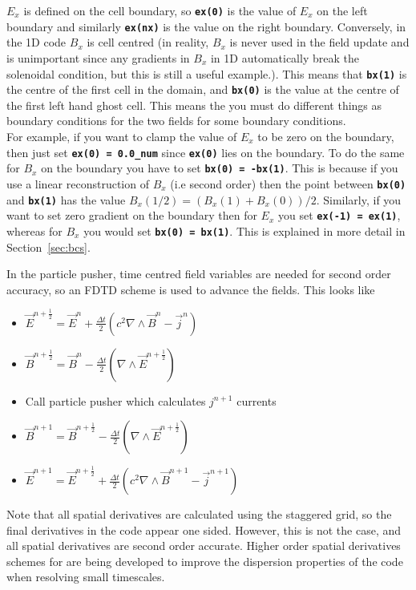 \documentclass[12pt,a4paper]{article}
\newcommand{\inlinecode}[1]{{\color{warwickred} \bf\texttt{#1}}}
\newcommand{\EPOCH}{{\color{warwickdark}\fontfamily{phv}\selectfont{EPOCH}}}
\begin{document}
$E_x$ is defined on the cell boundary, so \inlinecode{ex(0)} is the value of
$E_x$ on the left boundary and similarly \inlinecode{ex(nx)} is the
value on the right boundary. Conversely, in the 1D code $B_x$ is cell centred
(in reality, $B_x$ is never used in the field update and is unimportant since
any gradients in $B_x$ in 1D automatically break the solenoidal condition, but
this is still a useful example.). This means that \inlinecode{bx(1)} is the
centre of the first cell in the domain, and \inlinecode{bx(0)} is the value at
the centre of the first left hand ghost cell. This means the you must do
different things as boundary conditions for the two fields for some boundary
conditions.\\

For example, if you want to clamp the value of $E_x$ to be zero on the
boundary, then just set \inlinecode{ex(0) = 0.0\_num} since \inlinecode{ex(0)}
lies on the boundary. To do the same for $B_x$ on the boundary you have to
set \inlinecode{bx(0) = -bx(1)}. This is because if you use a linear
reconstruction of $B_x$ (i.e second order) then the point between
\inlinecode{bx(0)} and \inlinecode{bx(1)} has the value
$B_x(1/2) = \left(B_x(1)+B_x(0)\right)/2$. Similarly, if you want to set zero
gradient on the boundary then for $E_x$ you set \inlinecode{ex(-1) = ex(1)},
whereas for $B_x$ you would set \inlinecode{bx(0) = bx(1)}. This is explained
in more detail in Section~\ref{sec:bcs}.

In the particle pusher, time centred field variables are needed for second
order accuracy, so an FDTD scheme is used to advance the fields. This looks
like

\begin{itemize}
\item $\vec{E}^{n+\frac{1}{2}} = \vec{E}^n + \frac{\Delta t}{2} \left( c^2
  \nabla \wedge \vec{B}^{n} -\vec{j}^{n} \right)$
\item $\vec{B}^{n+\frac{1}{2}} = \vec{B}^n - \frac{\Delta t}{2} \left( \nabla
  \wedge \vec{E}^{n+\frac{1}{2}} \right)$
\item Call particle pusher which calculates $j^{n+1}$ currents
\item $\vec{B}^{n+1} = \vec{B}^{n+\frac{1}{2}} - \frac{\Delta t}{2} \left(
  \nabla \wedge \vec{E}^{n+\frac{1}{2}} \right)$
\item $\vec{E}^{n+1} = \vec{E}^{n+\frac{1}{2}} + \frac{\Delta t}{2} \left( c^2
  \nabla \wedge \vec{B} ^{n+1} - \vec{j}^{n+1} \right)$
\end{itemize}
Note that all spatial derivatives are calculated using the staggered grid, so
the final derivatives in the code appear one sided. However, this is not the
case, and all spatial derivatives are second order accurate. Higher order
spatial derivatives schemes for {\EPOCH} are being developed to improve the
dispersion properties of the code when resolving small timescales.
\end{document}
